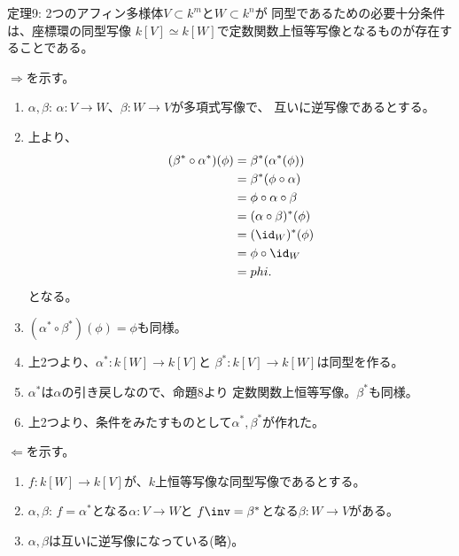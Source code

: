 \begin{framed}
  定理9:
  2つのアフィン多様体$V\subset k^m$と$W\subset k^n$が
  同型であるための必要十分条件は、座標環の同型写像
  $k[V]\simeq k[W]$で定数関数上恒等写像となるものが存在することである。
\end{framed}
\begin{myproof}
  $\Rightarrow$を示す。
  \begin{enumerate}
    \item $\alpha,\beta$: $\alpha\colon V\to W$、$\beta\colon W \to V$が多項式写像で、
    互いに逆写像であるとする。
    \item 上より、
    \begin{align}
      (\beta^* \circ \alpha^*)(\phi)
      &=
      \beta^*(\alpha^*(\phi))\\
      &=
      \beta^*(\phi\circ \alpha)\\
      &=
      \phi\circ \alpha \circ \beta\\
      &=
      (\alpha\circ \beta)^*(\phi)\\
      &=
      (\id_W)^*(\phi)\\
      &=
      \phi\circ \id_W\\
      &=
      phi.
    \end{align}
    となる。
    \item $(\alpha^*\circ \beta^*)(\phi) = \phi$も同様。
    \item 上2つより、$\alpha^* \colon k[W] \to k[V]$と
    $\beta^*\colon k[V] \to k[W]$は同型を作る。
    \item $\alpha^*$は$\alpha$の引き戻しなので、命題8より
    定数関数上恒等写像。$\beta^*$も同様。
    \item 上2つより、条件をみたすものとして$\alpha^*,\beta^*$が作れた。
  \end{enumerate}

  $\Leftarrow$を示す。
  \begin{enumerate}
    \item $f\colon k[W] \to k[V]$が、$k$上恒等写像な同型写像であるとする。
    \item $\alpha,\beta$: $f=\alpha^*$となる$\alpha\colon V\to W$と
    $f\inv = \beta^*$となる$\beta\colon W \to V$がある。
    \item
    $\alpha,\beta$は互いに逆写像になっている(略)。

  \end{enumerate}
\end{myproof}

